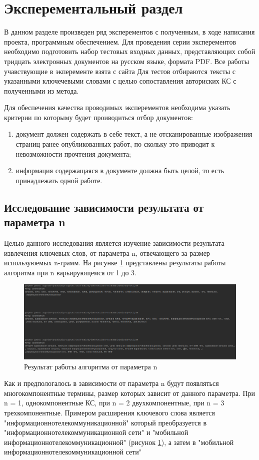 \section{Эксперементальный раздел}
В данном разделе произведен ряд эксперементов с полученным, в ходе написания проекта, программным обеспечением.
Для проведения серии эксперементов необходимо подготовить набор тестовых входных данных, представляющих собой тридцать электронных документов на русском языке, формата PDF.
Все работы учавствующие в экперементе взята с сайта 
Для тестов отбираются тексты с указанными ключечевыми словами с целью сопоставления авториских КС с полученными из метода.

Для обеспечения качества проводимых эксперементов необходима указать критерии по которыму будет проиводиться отбор документов:
\begin{enumerate}
	\item документ должен содержать в себе текст, а не отсканированные изображения страниц ранее опубликованных работ, по скольку это приводит к невозможности прочтения документа;
	\item информация содержащаяся в документе должна быть целой, то есть принадлежать одной работе.
\end{enumerate}

\subsection{Исследование зависимости результата от параметра n}
Целью данного исследования является изучение зависимости результата извлечения ключевых слов, от параметра n, отвечающего за размер используюемых n-грамм.
На рисунке \ref{fig:experiment24} представлены результаты работы алгоритма при n варьирующемся от 1 до 3.

\begin{figure}[!h]
	\centering
	\includegraphics[width=1\linewidth]{src/img/experiment/experiment_2_4}
	\caption{Результат работы алгоритма от параметра n}
	\label{fig:experiment24}
\end{figure}
Как и предпологалось в зависимости от параметра n будут появляться многокомпонентные термины, размер которых зависит от данного параметра.
При n = 1, однокомпонентные КС, при n = 2 двухкомпонентные, при n = 3 трехкомпонентные.
Примером расширения ключевого слова является "информационнотелекоммуникационной" который преобразуется в "информационнотелекоммуникационной сети" и "мобильной информационнотелекоммуникационной" (рисунок \ref{fig:experiment24}), а затем в "мобильной информационнотелекоммуникационной сети"


